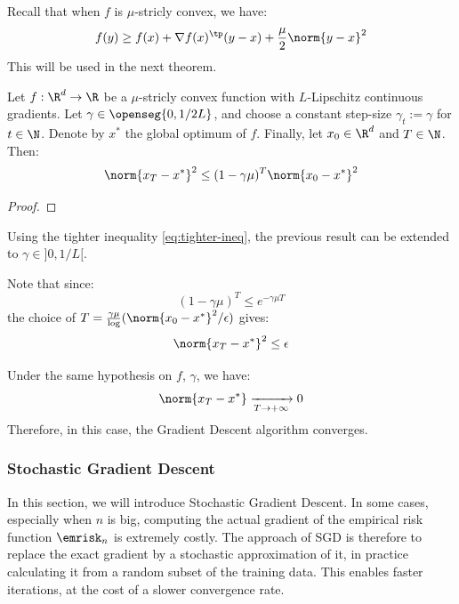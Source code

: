 \documentclass[toc, titlepaged]{../cs-classes/cs-classes}
\begin{document}
Recall that when $f$ is $\mu$-stricly convex, we have:
\begin{equation*}
    f(y)\geq f(x)+\nabla f(x)^\tp(y-x)+\frac{\mu}{2}\norm{y-x}^2
\end{equation*}
This will be used in the next theorem.

\begin{theorem}
    Let $f:\R^d\to\R$ be a $\mu$-stricly convex function with $L$-Lipschitz continuous gradients. Let $\gamma\in\openseg{0, 1/2L}$, and choose a constant step-size $\gamma_t:=\gamma$ for $t\in\N$. Denote by $x^*$ the global optimum of $f$. Finally, let $x_0\in\R^d$ and $T\in\N$. Then:
    \begin{equation*}
        \norm{x_T-x^*}^2\leq(1-\gamma\mu)^T\norm{x_0-x^*}^2
    \end{equation*}
\end{theorem}
\begin{proof}
\end{proof}

\begin{remark}
    Using the tighter inequality \eqref{eq:tighter-ineq}, the previous result can be extended to $\gamma\in\rbrack 0, 1/L\lbrack$.
\end{remark}

Note that since:
\begin{equation*}
    (1-\gamma\mu)^T\leq e^{-\gamma\mu T}
\end{equation*}
the choice of $T=\frac{\gamma\mu}\log(\norm{x_0-x^*}^2/\epsilon)$ gives:
\begin{equation*}
    \norm{x_T-x^*}^2\leq\epsilon
\end{equation*}

\begin{corollary}
    Under the same hypothesis on $f$, $\gamma$, we have:
    \begin{equation}
        \norm{x_T-x^*} \xrightarrow[T\to+\infty]{} 0
    \end{equation}
    Therefore, in this case, the Gradient Descent algorithm converges.
\end{corollary}

\subsubsection{Stochastic Gradient Descent}
In this section, we will introduce Stochastic Gradient Descent. In some cases, especially when $n$ is big, computing the actual gradient of the empirical risk function $\emrisk_n$ is extremely costly. The approach of SGD is therefore to replace the exact gradient by a stochastic approximation of it, in practice calculating it from a random subset of the training data. This enables faster iterations, at the cost of a slower convergence rate.
\end{document}
